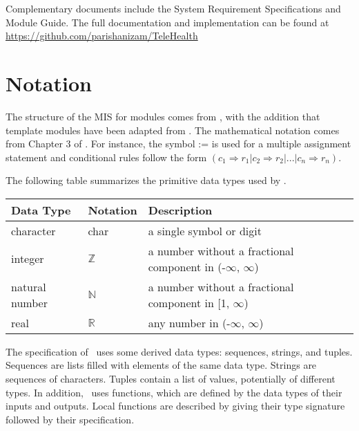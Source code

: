 \documentclass[12pt, titlepage]{article}
\begin{document}
Complementary documents include the System Requirement Specifications
and Module Guide.  The full documentation and implementation can be
found at \url{https://github.com/parishanizam/TeleHealth} 

\section{Notation}


The structure of the MIS for modules comes from \citet{HoffmanAndStrooper1995},
with the addition that template modules have been adapted from
\cite{GhezziEtAl2003}.  The mathematical notation comes from Chapter 3 of
\citet{HoffmanAndStrooper1995}.  For instance, the symbol := is used for a
multiple assignment statement and conditional rules follow the form $(c_1
\Rightarrow r_1 | c_2 \Rightarrow r_2 | ... | c_n \Rightarrow r_n )$.

The following table summarizes the primitive data types used by \progname. 

\begin{center}
\renewcommand{\arraystretch}{1.2}
\noindent 
\begin{tabular}{l l p{7.5cm}} 
\toprule 
\textbf{Data Type} & \textbf{Notation} & \textbf{Description}\\ 
\midrule
character & char & a single symbol or digit\\
integer & $\mathbb{Z}$ & a number without a fractional component in (-$\infty$, $\infty$) \\
natural number & $\mathbb{N}$ & a number without a fractional component in [1, $\infty$) \\
real & $\mathbb{R}$ & any number in (-$\infty$, $\infty$)\\
\bottomrule
\end{tabular} 
\end{center}

\noindent
The specification of \progname \ uses some derived data types: sequences, strings, and
tuples. Sequences are lists filled with elements of the same data type. Strings
are sequences of characters. Tuples contain a list of values, potentially of
different types. In addition, \progname \ uses functions, which
are defined by the data types of their inputs and outputs. Local functions are
described by giving their type signature followed by their specification.
\end{document}
